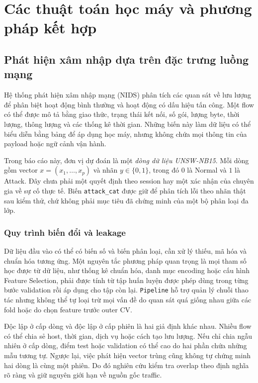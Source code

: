 \section{Các thuật toán học máy và phương pháp kết hợp}
\label{chap:ly-thuyet}

\subsection{Phát hiện xâm nhập dựa trên đặc trưng luồng mạng}
Hệ thống phát hiện xâm nhập mạng (NIDS) phân tích các quan sát về lưu lượng để phân biệt hoạt động bình thường và hoạt động có dấu hiệu tấn công. Một flow có thể được mô tả bằng giao thức, trạng thái kết nối, số gói, lượng byte, thời lượng, thông lượng và các thống kê thời gian. Những biến này làm dữ liệu có thể biểu diễn bằng bảng để áp dụng học máy, nhưng không chứa mọi thông tin của payload hoặc ngữ cảnh vận hành.

Trong báo cáo này, đơn vị dự đoán là một \emph{dòng dữ liệu UNSW-NB15}. Mỗi dòng gồm vector $x=(x_1,\ldots,x_p)$ và nhãn $y\in\{0,1\}$, trong đó $0$ là Normal và $1$ là Attack. Đây chưa phải một quyết định theo session hay một xác nhận của chuyên gia về sự cố thực tế. Biến \texttt{attack\_cat} được giữ để phân tích lỗi theo nhãn thật sau kiểm thử, chứ không phải mục tiêu đã chứng minh của một bộ phân loại đa lớp.

\subsubsection{Quy trình biến đổi và leakage}
Dữ liệu đầu vào có thể có biến số và biến phân loại, cần xử lý thiếu, mã hóa và chuẩn hóa tương ứng. Một nguyên tắc phương pháp quan trọng là mọi tham số học được từ dữ liệu, như thống kê chuẩn hóa, danh mục encoding hoặc cấu hình Feature Selection, phải được tính từ tập huấn luyện được phép dùng trong từng bước validation rồi áp dụng cho tập còn lại. \texttt{Pipeline} hỗ trợ quản lý chuỗi thao tác nhưng không thể tự loại trừ mọi vấn đề do quan sát quá giống nhau giữa các fold hoặc do chọn feature trước outer CV.

Độc lập ở cấp dòng và độc lập ở cấp phiên là hai giả định khác nhau. Nhiều flow có thể chia sẻ host, thời gian, dịch vụ hoặc cách tạo lưu lượng. Nếu chỉ chia ngẫu nhiên ở cấp dòng, điểm test hoặc validation có thể cao do hai phần chứa những mẫu tương tự. Ngược lại, việc phát hiện vector trùng cũng không tự chứng minh hai dòng là cùng một phiên. Do đó nghiên cứu kiểm tra overlap theo định nghĩa rõ ràng và giữ nguyên giới hạn về nguồn gốc traffic.

